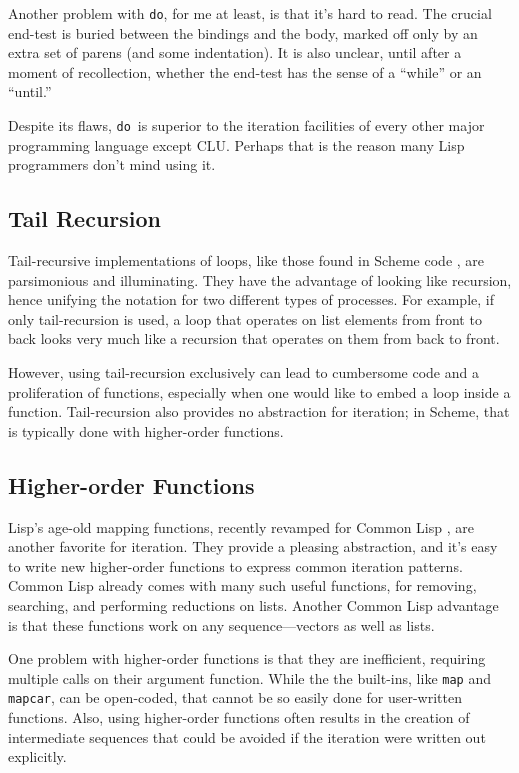 \documentclass[12pt]{article}
\newcommand{\lisp}{\tt}
\newcommand{\Do}{{\lisp do}}
\begin{document}
Another problem with \Do, for me at least, is that it's hard to read.
The crucial end-test is buried between the bindings and the body,
marked off only by an extra set of parens (and some indentation).  It
is also unclear, until after a moment of recollection, whether the
end-test has the sense of a ``while'' or an ``until.''

Despite its flaws, \Do\ is superior to the iteration facilities of
every other major programming language except CLU.  Perhaps that is
the reason many Lisp programmers don't mind using it.


\subsection{Tail Recursion}

Tail-recursive implementations of loops, like those found in Scheme
code \cite{SchemeBook}, are parsimonious and illuminating.  They have
the advantage of looking like recursion, hence unifying the notation
for two different types of processes.  For example, if only
tail-recursion is used, a loop that operates on list elements from
front to back looks very much like a recursion that operates on them
from back to front.

However, using tail-recursion exclusively can lead to cumbersome code
and a proliferation of functions, especially when one would like to
embed a loop inside a function.  Tail-recursion also provides no
abstraction for iteration; in Scheme, that is typically done with
higher-order functions.


\subsection{Higher-order Functions}

Lisp's age-old mapping functions, recently revamped for Common Lisp
\cite{CLM}, are another favorite for iteration.  They provide a
pleasing abstraction, and it's easy to write new higher-order
functions to express common iteration patterns.  Common Lisp already
comes with many such useful functions, for removing, searching, and
performing reductions on lists.  Another Common Lisp advantage is that
these functions work on any sequence---vectors as well as lists.

One problem with higher-order functions is that they are inefficient,
requiring multiple calls on their argument function.  While the the
built-ins, like {\lisp map} and {\lisp mapcar}, can be open-coded,
that cannot be so easily done for user-written functions.  Also, using
higher-order functions often results in the creation of intermediate
sequences that could be avoided if the iteration were written out
explicitly. 
\end{document}
